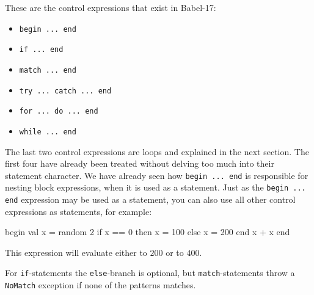 \documentclass[11pt]{amsart}
\newcommand{\babelsrc}[1] {\lstinline!#1!}
\begin{document}
These are the control expressions that exist in Babel-17:
\begin{itemize}
\item \babelsrc{begin ... end}
\item \babelsrc{if ... end}
\item \babelsrc{match ... end}
\item \babelsrc{try ... catch ... end}
\item \babelsrc{for ... do ... end}
\item \babelsrc{while ... end}
\end{itemize}
The last two control expressions are loops and explained in the next section. The first four have already been treated without delving too much into their statement character. We have already seen how  \babelsrc{begin ... end} is responsible for nesting block expressions, when it is used as a statement.  Just as  the \babelsrc{begin ... end} expression may be used as a statement, 
you can also use all other control expressions as statements, for example:
\begin{babellisting}
begin
  val x = random 2
  if x == 0 then
    x = 100
  else
    x = 200
  end
  x + x
end
\end{babellisting}
This expression will evaluate either to $200$ or to $400$.

For \babelsrc{if}-statements the \babelsrc{else}-branch is optional, but \babelsrc{match}-statements throw a \babelsrc{NoMatch} exception if none of the patterns matches. 
\end{document}
